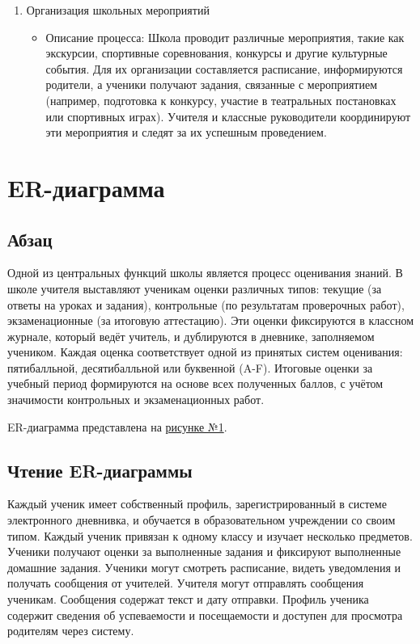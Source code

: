 \documentclass[a4paper, final]{article}
\begin{document}
\begin{enumerate}
  \item Организация школьных мероприятий
  \begin{itemize}
    \item Описание процесса: Школа проводит различные мероприятия, такие как экскурсии, спортивные соревнования, конкурсы и другие культурные события. Для их организации составляется расписание, информируются родители, а ученики получают задания, связанные с мероприятием (например, подготовка к конкурсу, участие в театральных постановках или спортивных играх). Учителя и классные руководители координируют эти мероприятия и следят за их успешным проведением.
  \end{itemize}
\end{enumerate}


\newpage
\section{ER-диаграмма}
\subsection{Абзац}
Одной из центральных функций школы является процесс оценивания знаний. В школе учителя выставляют ученикам оценки различных типов: текущие (за ответы на уроках и задания), контрольные (по результатам проверочных работ), экзаменационные (за итоговую аттестацию). Эти оценки фиксируются в классном журнале, который ведёт учитель, и дублируются в дневнике, заполняемом учеником. Каждая оценка соответствует одной из принятых систем оценивания: пятибалльной, десятибалльной или буквенной (A-F). Итоговые оценки за учебный период формируются на основе всех полученных баллов, с учётом значимости контрольных и экзаменационных работ.


ER-диаграмма представлена на \hyperlink{diag:er}{рисунке №1}.

\newpage
\hypertarget{diag:er}{}

\addtocounter{figure}{1}
\newpage

\subsection{Чтение ER-диаграммы}
Каждый ученик имеет собственный профиль, зарегистрированный в системе электронного дневнивка, и обучается в образовательном учреждении со своим типом. Каждый ученик привязан к одному классу и изучает несколько предметов. Ученики получают оценки за выполненные задания и фиксируют выполненные домашние задания. Ученики могут смотреть расписание, видеть уведомления и получать сообщения от учителей. Учителя могут отправлять сообщения ученикам. Сообщения содержат текст и дату отправки. Профиль ученика содержит сведения об успеваемости и посещаемости и доступен для просмотра родителям через систему.
\end{document}
